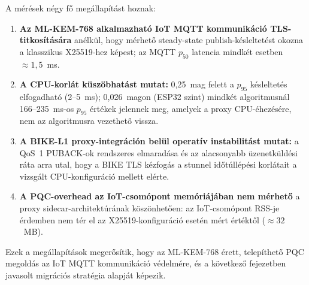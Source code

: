 A mérések négy fő megállapítást hoznak:

\begin{enumerate}
    \item \textbf{Az ML-KEM-768 alkalmazható IoT MQTT kommunikáció TLS-titkosítására}
          anélkül, hogy mérhető steady-state publish-késleltetést okozna a klasszikus
          X25519-hez képest; az MQTT $p_{50}$ latencia mindkét esetben $\approx 1{,}5$~ms.
    \item \textbf{A CPU-korlát küszöbhatást mutat:} 0,25~mag felett a $p_{95}$ késleltetés
          elfogadható (2--5~ms); 0,026~magon (ESP32 szint) mindkét algoritmusnál
          166--235~ms-os $p_{95}$ értékek jelennek meg, amelyek a proxy CPU-éhezésére,
          nem az algoritmusra vezethető vissza.
    \item \textbf{A BIKE-L1 proxy-integráción belül operatív instabilitást mutat:}
          a QoS~1 PUBACK-ok rendszeres elmaradása és az alacsonyabb üzenetküldési ráta
          arra utal, hogy a BIKE TLS kézfogás a stunnel időtúllépési korlátait a vizsgált
          CPU-konfiguráció mellett elérte.
    \item \textbf{A PQC-overhead az IoT-csomópont memóriájában nem mérhető} a proxy
          sidecar-architektúrának köszönhetően: az IoT-csomópont RSS-je érdemben
          nem tér el az X25519-konfiguráció esetén mért értéktől ($\approx 32$~MB).
\end{enumerate}

Ezek a megállapítások megerősítik, hogy az ML-KEM-768 érett, telepíthető PQC megoldás
az IoT MQTT kommunikáció védelmére, és a következő fejezetben javasolt migrációs stratégia
alapját képezik.
